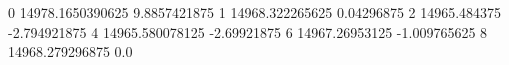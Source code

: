 0 14978.1650390625 9.8857421875
1 14968.322265625 0.04296875
2 14965.484375 -2.794921875
4 14965.580078125 -2.69921875
6 14967.26953125 -1.009765625
8 14968.279296875 0.0
